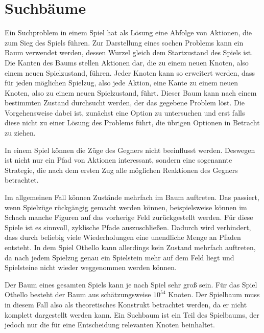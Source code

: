 \section{Suchbäume}

Ein Suchproblem in einem Spiel hat als Lösung eine Abfolge von Aktionen, die zum Sieg des Spiels führen.
Zur Darstellung eines sochen Problems kann ein Baum verwendet werden, dessen Wurzel gleich dem Startzustand des Spiels ist.
Die Kanten des Baums stellen Aktionen dar, die zu einem neuen Knoten, also einem neuen Spielzustand, führen.
Jeder Knoten kann so erweitert werden, dass für jeden möglichen Spielzug, also jede Aktion, eine Kante zu einem neuen Knoten, also zu einem neuen Spielzustand, führt.
Dieser Baum kann nach einem bestimmten Zustand durchsucht werden, der das gegebene Problem löst.
Die Vorgehensweise dabei ist, zunächst eine Option zu untersuchen und erst falls diese nicht zu einer Lösung des Problems führt, die übrigen Optionen in Betracht zu ziehen.
\cite[S.~75]{ai2010russel}

In einem Spiel können die Züge des Gegners nicht beeinflusst werden.
Deswegen ist nicht nur ein Pfad von Aktionen interessant, sondern eine sogenannte Strategie, die nach dem ersten Zug alle möglichen Reaktionen des Gegners betrachtet.
\cite[S.~163]{ai2010russel}

Im allgemeinen Fall können Zustände mehrfach im Baum auftreten.
Das passiert, wenn Spielzüge rückgängig gemacht werden können, beispielsweise können im Schach manche Figuren auf das vorherige Feld zurückgestellt werden.
Für diese Spiele ist es sinnvoll, zyklische Pfade auszuschließen. %
Dadurch wird verhindert, dass durch beliebig viele Wiederholungen eine unendliche Menge an Pfaden entsteht.
\cite[S.~75]{ai2010russel}
In dem Spiel Othello kann allerdings kein Zustand mehrfach auftreten, da nach jedem Spielzug genau ein Spielstein mehr auf dem Feld liegt und Spielsteine nicht wieder weggenommen werden können.

Der Baum eines gesamten Spiels kann je nach Spiel sehr groß sein.
Für das Spiel Othello besteht der Baum aus schätzungsweise $10^{54}$ Knoten. %
Der Spielbaum muss in diesem Fall also als theoretisches Konstrukt betrachtet werden, da er nicht komplett dargestellt werden kann.
Ein Suchbaum ist ein Teil des Spielbaums, der jedoch nur die für eine Entscheidung relevanten Knoten beinhaltet.
\cite[S.~162f.]{ai2010russel}
